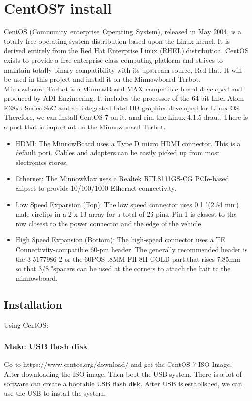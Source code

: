 \documentclass[10pt,draftclsnofoot,peerreview ,letterpaper,onecolumn,]{IEEEtran}
\begin{document}
	\section{CentOS7 install}
	CentOS (Community enterprise Operating System), released in May 2004, is a totally free operating system distribution based upon the Linux kernel. It is derived entirely from the Red Hat Enterprise Linux (RHEL) distribution. CentOS exists to provide a free enterprise class computing platform and strives to maintain totally binary compatibility with its upstream source, Red Hat. It will be used in this project and install it on the Minnowboard Turbot.\\
	Minnowboard Turbot is a MinnowBoard MAX compatible board developed and produced by ADI Engineering. It includes the processor of the 64-bit Intel Atom E38xx Series SoC and an integrated Intel HD graphics developed for Linux OS. Therefore, we can install CentOS 7 on it, amd rim the Linux 4.1.5 drauf. There is a port that is important on the Minnowboard Turbot.\\
	\begin{itemize}
		\item HDMI: The MinnowBoard uses a Type D micro HDMI connector. This is a default port. Cables and adapters can be easily picked up from most electronics stores.
		\item Ethernet: The MinnowMax uses a Realtek RTL8111GS-CG PCIe-based chipset to provide 10/100/1000 Ethernet connectivity.
		\item Low Speed Expansion (Top): The low speed connector uses 0.1 "(2.54 mm) male circlips in a 2 x 13 array for a total of 26 pins. Pin 1 is closest to the row closest to the power connector and the edge of the vehicle.
		\item High Speed Expansion (Bottom): The high-speed connector uses a TE Connectivity-compatible 60-pin header. The generally recommended header is the 3-5177986-2 or the 60POS .8MM FH 8H GOLD part that rises 7.85mm so that 3/8 "spacers can be used at the corners to attach the bait to the minnowboard.
	\end{itemize}
	\subsection{Installation}
	Using CentOS:
	\subsubsection{Make USB flash disk}
	Go to https://www.centos.org/download/ and get the CentOS 7 ISO Image. After downloading the ISO image. Then boot the USB system. There is a lot of software can create a bootable USB flash disk. After USB is established, we can use the USB to install the system.
\end{document}
